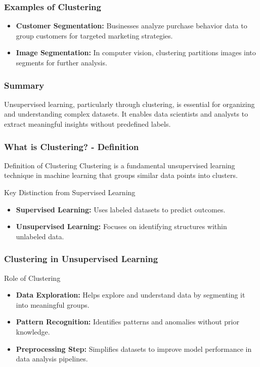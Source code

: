 \documentclass[aspectratio=169]{beamer}
\begin{document}
\begin{frame}[fragile]
    \frametitle{Examples of Clustering}
    \begin{itemize}
        \item \textbf{Customer Segmentation:} Businesses analyze purchase behavior data to group customers for targeted marketing strategies.
        \item \textbf{Image Segmentation:} In computer vision, clustering partitions images into segments for further analysis.
    \end{itemize}
\end{frame}

\begin{frame}[fragile]
    \frametitle{Summary}
    Unsupervised learning, particularly through clustering, is essential for organizing and understanding complex datasets. 
    It enables data scientists and analysts to extract meaningful insights without predefined labels.
\end{frame}

\begin{frame}[fragile]
    \frametitle{What is Clustering? - Definition}
    \begin{block}{Definition of Clustering}
        Clustering is a fundamental unsupervised learning technique in machine learning that groups similar data points into clusters.
    \end{block}
    \begin{block}{Key Distinction from Supervised Learning}
        \begin{itemize}
            \item \textbf{Supervised Learning:} Uses labeled datasets to predict outcomes.
            \item \textbf{Unsupervised Learning:} Focuses on identifying structures within unlabeled data.
        \end{itemize}
    \end{block}
\end{frame}

\begin{frame}[fragile]
    \frametitle{Clustering in Unsupervised Learning}
    \begin{block}{Role of Clustering}
        \begin{itemize}
            \item \textbf{Data Exploration:} Helps explore and understand data by segmenting it into meaningful groups.
            \item \textbf{Pattern Recognition:} Identifies patterns and anomalies without prior knowledge.
            \item \textbf{Preprocessing Step:} Simplifies datasets to improve model performance in data analysis pipelines.
        \end{itemize}
    \end{block}
\end{frame}
\end{document}
